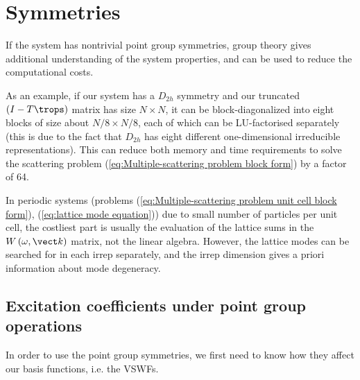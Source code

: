 %

\section{Symmetries}\label{sec:Symmetries}

If the system has nontrivial point group symmetries, group theory
gives additional understanding of the system properties, and can be
used to reduce the computational costs. 

As an example, if our system has a $D_{2h}$ symmetry and our truncated
$\left(I-T\trops\right)$ matrix has size $N\times N$, it can be
block-diagonalized into eight blocks of size about $N/8\times N/8$,
each of which can be LU-factorised separately (this is due to the
fact that $D_{2h}$ has eight different one-dimensional irreducible
representations). This can reduce both memory and time requirements
to solve the scattering problem (\ref{eq:Multiple-scattering problem block form})
by a factor of 64.

In periodic systems (problems (\ref{eq:Multiple-scattering problem unit cell block form}),
(\ref{eq:lattice mode equation})) due to small number of particles
per unit cell, the costliest part is usually the evaluation of the
lattice sums in the $W\left(\omega,\vect k\right)$ matrix, not the
linear algebra. However, the lattice modes can be searched for in
each irrep separately, and the irrep dimension gives a priori information
about mode degeneracy.

\subsection{Excitation coefficients under point group operations}

In order to use the point group symmetries, we first need to know
how they affect our basis functions, i.e. the VSWFs.

